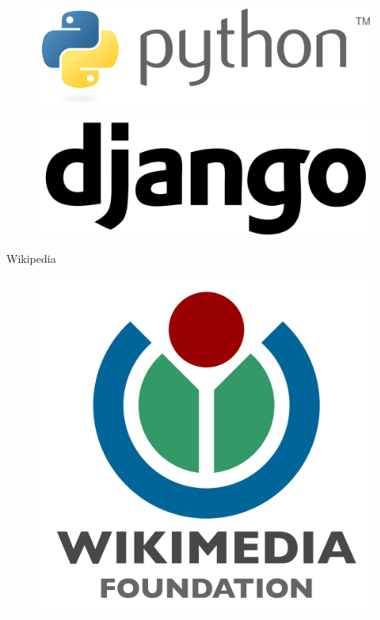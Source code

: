 \documentclass[aspectratio=169]{beamer}
\begin{document}
\begin{frame}{}
    \begin{figure}[htb]
    \includegraphics[width=\textwidth]{python.png}
    \end{figure}
\end{frame}

\begin{frame}{}
    \begin{figure}[htb]
    \includegraphics[width=\textwidth]{django.png}
    \end{figure}
\end{frame}

\begin{frame}{Wikipedia}
    \begin{figure}[htb]
    \includegraphics[height=0.8\textheight]{wikimedia.png}
    \end{figure}
\end{frame}
\end{document}
